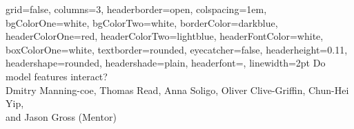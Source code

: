 \documentclass[a0paper,landscape,fontscale=0.3]{baposter}
\begin{document}

\begin{poster}
{
grid=false,
columns=3, %
headerborder=open, %
colspacing=1em, %
bgColorOne=white, %
bgColorTwo=white, %
borderColor=darkblue, %
headerColorOne=red, %
headerColorTwo=lightblue, %
headerFontColor=white, %
boxColorOne=white, %
textborder=rounded, %
eyecatcher=false, %
headerheight=0.11\textheight, %
headershape=rounded, %
headershade=plain,
headerfont=\Large\textsf, %
linewidth=2pt %
}
{}
%
%
{
\textsf %
{Do model features interact?
}
} %
{\sf\vspace{0.5em}\\
Dmitry Manning-coe, Thomas Read, Anna Soligo, Oliver Clive-Griffin, Chun-Hei Yip, \\and Jason Gross (Mentor)  
}
\end{poster}
\end{document}
